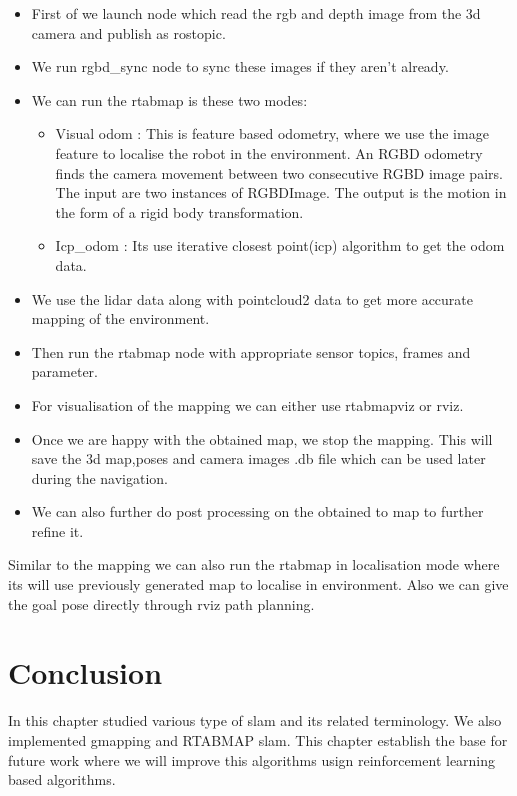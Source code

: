     \begin{itemize}
    \item First of we launch node which read the rgb and depth image from the 3d camera and publish as rostopic.
    \item We run rgbd\_sync node to sync these images if they aren't already.
    \item We can run the rtabmap is these two modes:
    \begin{itemize}
        \item Visual odom : This is feature based odometry, where we use the image feature to localise the robot in the environment. An RGBD odometry finds the camera movement between two consecutive RGBD image pairs. The input are two instances of RGBDImage. The output is the motion in the form of a rigid body transformation.
        \item Icp\_odom : Its use iterative closest point(icp) algorithm to get the odom data.
    \end{itemize}
    
    \item We use the lidar data along with pointcloud2 data to get more accurate mapping of the environment.
    \item Then run the rtabmap node with appropriate sensor topics, frames and parameter.
    \item For visualisation of the mapping we can either use rtabmapviz or rviz.
    \item Once we are happy with the obtained map, we stop the mapping. This will save the 3d map,poses and camera images .db file which can be used later during the navigation.
    \item We can also further do post processing on the obtained to map to further refine it.
\end{itemize}

Similar to the mapping we can also run the rtabmap in localisation mode where its will use previously generated map to localise in environment. Also we can give the goal pose directly through rviz path planning.


\section{Conclusion}
In this chapter studied various type of slam and its related terminology. We also implemented gmapping and RTABMAP slam. This chapter establish the base for future work where we will improve this algorithms usign reinforcement learning based algorithms.
% 